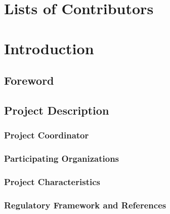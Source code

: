 \documentclass[
  11pt,
]{article}
\begin{document}
\clearpage

\hypertarget{lists-of-contributors}{%
\section*{Lists of Contributors}\label{lists-of-contributors}}

\clearpage


\clearpage

\hypertarget{introduction}{%
\section{Introduction}\label{introduction}}

\hypertarget{foreword}{%
\subsection{Foreword}\label{foreword}}

\hypertarget{project-description}{%
\subsection{Project Description}\label{project-description}}

\hypertarget{project-coordinator}{%
\subsubsection{Project Coordinator}\label{project-coordinator}}

\hypertarget{participating-organizations}{%
\subsubsection{Participating
Organizations}\label{participating-organizations}}

\hypertarget{project-characteristics}{%
\subsubsection{Project Characteristics}\label{project-characteristics}}

\hypertarget{regulatory-framework-and-references}{%
\subsubsection{Regulatory Framework and
References}\label{regulatory-framework-and-references}}
\end{document}
